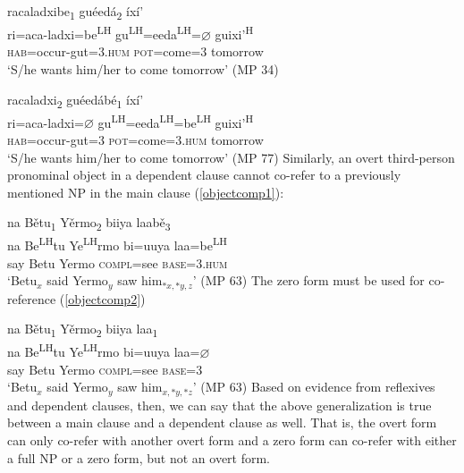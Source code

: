 \ea\label{control3}
\glll racaladxibe\textsubscript{1} gu\'{e}ed\'{a}\textsubscript{2} \'{i}x\'{i}' \\
ri=aca-ladxi=be\textsuperscript{LH}  gu\textsuperscript{LH}=eeda\textsuperscript{LH}={$\varnothing$} guixi'\textsuperscript{H}  \\
\textsc{hab}=occur-gut=\textsc{3.hum} \textsc{pot}=come=\textsc{3} tomorrow \\
\glt `S/he wants him/her to come tomorrow'  \hfill{(MP 34)}
\z

\ea\label{control4}
\glll racaladxi\textsubscript{2} gu\'{e}ed\'{a}b\'{e}\textsubscript{1} \'{i}x\'{i}' \\
ri=aca-ladxi={$\varnothing$} gu\textsuperscript{LH}=eeda\textsuperscript{LH}=be\textsuperscript{LH}  guixi'\textsuperscript{H}  \\
\textsc{hab}=occur-gut=\textsc{3} \textsc{pot}=come=\textsc{3.hum} tomorrow \\
\glt `S/he wants him/her to come tomorrow' \hfill{(MP 77)}
\z
Similarly, an overt third-person pronominal object in a dependent clause cannot co-refer to a previously mentioned NP in the main clause (\ref{objectcomp1}):

\ea\label{objectcomp1}
\glll na B\v{e}tu\textsubscript{1} Y\v{e}rmo\textsubscript{2} biiya laab\v{e}\textsubscript{3} \\
na Be\textsuperscript{LH}tu Ye\textsuperscript{LH}rmo bi=uuya laa=be\textsuperscript{LH}  \\
say Betu Yermo \textsc{compl}=see \textsc{base}=\textsc{3.hum} \\
\glt `Betu$_{x}$ said Yermo$_{y}$ saw him$_{*x, *y, z}$' \hfill{(MP 63)}
\z
The zero form must be used for co-reference (\ref{objectcomp2})

\ea\label{objectcomp2}
\glll na B\v{e}tu\textsubscript{1} Y\v{e}rmo\textsubscript{2} biiya laa\textsubscript{1} \\
na Be\textsuperscript{LH}tu Ye\textsuperscript{LH}rmo bi=uuya laa={$\varnothing$} \\
say Betu Yermo \textsc{compl}=see \textsc{base}=\textsc{3} \\
\glt `Betu$_{x}$ said Yermo$_{y}$ saw him$_{x, *y, *z}$' \hfill{(MP 63)}
\z
Based on evidence from reflexives and dependent clauses, then, we can say that the above generalization is true between a main clause and a dependent clause as well. That is, the overt form can only co-refer with another overt form and a zero form can co-refer with either a full NP or a zero form, but not an overt form.


